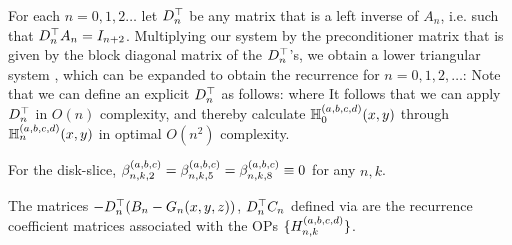 For each $n = 0,1,2\dots$ let $D^\top_n$ be any matrix that is a left inverse of $A_n$, i.e. such that $D^\top_n A_n = I_{n+2}$. Multiplying our system by the preconditioner matrix that is given by the block diagonal matrix of the $D^\top_n$'s, we obtain a lower triangular system \cite[p78]{dunkl2014orthogonal}, which can be expanded to obtain the recurrence for $n = 0,1,2,\dots$:
Note that we can define an explicit $D^\top_n$ as follows:
 where
It follows that we can apply $D^\top_n$ in $O(n)$ complexity, and thereby calculate $\mathbb{H}^{(a,b,c,d)}_{0}(x,y)$  through $\mathbb{H}^{(a,b,c,d)}_{n}(x,y)$ in optimal $O(n^2)$ complexity.

For the disk-slice, $\beta^{(a,b,c)}_{n,k,2} = \beta^{(a,b,c)}_{n,k,5} = \beta^{(a,b,c)}_{n,k,8} \equiv 0$ for any $n, k$.

\begin{definition}\label{def:sc:clenshawmats}
	The matrices $-D^\top_n (B_n-G_n(x,y,z))$, $D^\top_n C_n$ defined via  are the recurrence coefficient matrices associated with the OPs $\{H_{n,k}^{(a,b,c,d)}\}$.
\end{definition}

